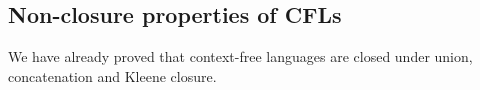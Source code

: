 \subsection{Non-closure properties of CFLs}
We have already proved that context-free languages are closed under union, concatenation and Kleene closure.
